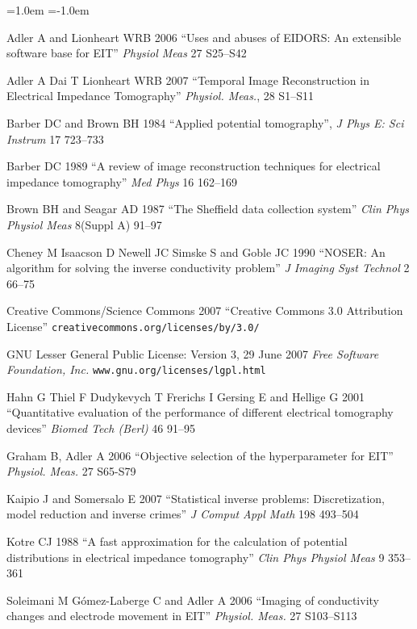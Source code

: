 \documentclass[letterpaper,twocolumn,11pt]{article}
\begin{document}
\begin{list}{}
  {\leftmargin=1.0em \itemindent=-1.0em
    \baselineskip
    \baselineskip}
\item[]
Adler A and Lionheart WRB 2006
``Uses and abuses of EIDORS: An extensible software base for EIT''
{\em Physiol Meas}
27 S25--S42

\item[]
Adler A Dai T Lionheart WRB 2007
``Temporal Image Reconstruction in Electrical Impedance Tomography''
{\em Physiol. Meas.}, 28 S1--S11


\item[]
Barber DC and Brown BH 1984
``Applied potential tomography'', 
{\em J Phys E: Sci Instrum}
 17 723--733

\item[]
Barber DC 1989
``A review of image reconstruction techniques for electrical
 impedance tomography''
{\em Med Phys}
16 162--169

\item[]
Brown BH and Seagar AD 1987 
``The Sheffield data collection system''
{\em Clin Phys Physiol Meas}
 8(Suppl A) 91--97

\item[]
Cheney M Isaacson D Newell JC Simske S and Goble JC 1990
``NOSER: An algorithm for solving the inverse conductivity problem''
{\em J Imaging Syst Technol} 2 66--75

\item[]
Creative Commons/Science Commons 2007
``Creative Commons 3.0 Attribution License''
\verb+creativecommons.org/licenses/by/3.0/+

\item[]
GNU Lesser General Public License: Version 3, 29 June 2007
{\em Free Software Foundation, Inc.}
\verb+www.gnu.org/licenses/lgpl.html+

\item[]
Hahn G Thiel F Dudykevych T Frerichs I Gersing E
and Hellige G 2001
``Quantitative evaluation of the performance of
different electrical tomography devices''
{\em  Biomed Tech (Berl)}
46 91--95

\item[]
Graham B, Adler A 2006
``Objective selection of the hyperparameter for EIT''
{\em Physiol. Meas.}
27 S65-S79

\item[]
Kaipio J and Somersalo E 2007
``Statistical inverse problems: Discretization, model reduction and inverse crimes''
{\em J Comput Appl Math}
198 493--504

\item[]
Kotre CJ 1988
``A fast approximation for the calculation of potential distributions in electrical impedance tomography''
{\em Clin Phys Physiol Meas}
9 353--361

\item[]
Soleimani M G\'omez-Laberge C and Adler A 2006
``Imaging of conductivity changes and electrode movement in EIT''
{\em Physiol. Meas.} 27 S103--S113

\end{list}
\end{document}
